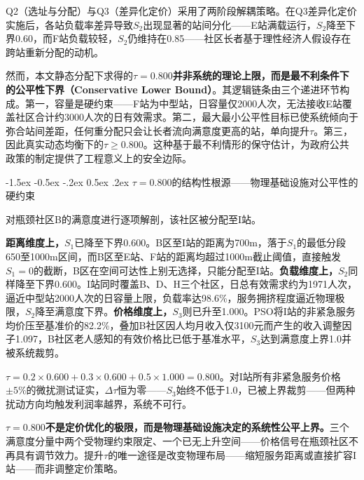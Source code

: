 \documentclass[zihao=-4]{cumcmthesis}
\makeatletter
\renewcommand\subsubsection{\@startsection{subsubsection}{3}{\z@}%
    {-1.5ex \@plus -0.5ex \@minus -.2ex}%
    {0.5ex \@plus .2ex}%
    {\normalfont\normalsize\bfseries}}
\makeatother
\begin{document}
Q2（选址与分配）与Q3（差异化定价）采用了两阶段解耦策略。在Q3差异化定价实施后，各站负载率差异导致$S_2$出现显著的站间分化——E站满载运行，$S_2$降至下界0.60，而F站负载较轻，$S_2$仍维持在0.85——社区长者基于理性经济人假设存在跨站重新分配的动机。

然而，本文静态分配下求得的$\tau=0.800$\textbf{并非系统的理论上限，而是最不利条件下的公平性下界（Conservative Lower Bound）}。其逻辑链条由三个递进环节构成。第一，容量是硬约束——F站为中型站，日容量仅2000人次，无法接收E站覆盖社区合计约3000人次的日有效需求。第二，最大最小公平性目标已使系统倾向于弥合站间差距，任何重分配只会让长者流向满意度更高的站，单向提升$\tau$。第三，因此真实动态均衡下的$\tau \ge 0.800$。这种基于最不利情形的保守估计，为政府公共政策的制定提供了工程意义上的安全边际。

\subsubsection{$\tau=0.800$的结构性根源——物理基础设施对公平性的硬约束}

对瓶颈社区B的满意度进行逐项解剖，该社区被分配至I站。

\textbf{距离维度上，}$S_1$已降至下界0.600。B区至I站的距离为700m，落于$S_1$的最低分段650至1000m区间，而B区至E站、F站的距离均超过1000m截止阈值，直接触发$S_1=0$的截断，B区在空间可达性上别无选择，只能分配至I站。\textbf{负载维度上，}$S_2$同样降至下界0.600。I站同时覆盖B、D、H三个社区，日总有效需求约为1971人次，逼近中型站2000人次的日容量上限，负载率达98.6\%，服务拥挤程度逼近物理极限，$S_2$降至满意度下界。\textbf{价格维度上，}$S_3$则已升至1.000。PSO将I站的非紧急服务均价压至基准价的82.2\%，叠加B社区因人均月收入仅3100元而产生的收入调整因子1.097，B社区老人感知的有效价格比已低于基准水平，$S_3$达到满意度上界1.0并被系统裁剪。

$\tau = 0.2 \times 0.600 + 0.3 \times 0.600 + 0.5 \times 1.000 = \mathbf{0.800}$。对I站所有非紧急服务价格$\pm 5\%$的微扰测试证实，$\Delta\tau$恒为零——$S_3$始终不低于1.0，已被上界裁剪——但两种扰动方向均触发利润率越界，系统不可行。

\textbf{$\tau=0.800$不是定价优化的极限，而是物理基础设施决定的系统性公平上界。}三个满意度分量中两个受物理约束限定、一个已无上升空间——价格信号在瓶颈社区不再具有调节效力。提升$\tau$的唯一途径是改变物理布局——缩短服务距离或直接扩容I站——而非调整定价策略。

\clearpage
\end{document}
